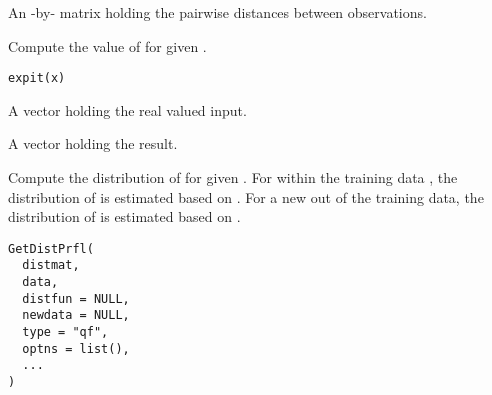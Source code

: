 \documentclass[a4paper]{book}
\begin{document}
%
\begin{Arguments}
\begin{ldescription}
\item[\code{distmat}] An -by- matrix holding the pairwise distances between observations.
\end{ldescription}
\end{Arguments}
%
\begin{Description}\relax
Compute the value of  for given .
\end{Description}
%
\begin{Usage}
\begin{verbatim}
expit(x)
\end{verbatim}
\end{Usage}
%
\begin{Arguments}
\begin{ldescription}
\item[\code{x}] A vector holding the real valued input.
\end{ldescription}
\end{Arguments}
%
\begin{Value}
A vector holding the result.
\end{Value}
%
\begin{Description}\relax
Compute the distribution of  for given . 
For  within the training data , 
the distribution of  is estimated based on .
For a new  out of the training data, 
the distribution of  is estimated based on .
\end{Description}
%
\begin{Usage}
\begin{verbatim}
GetDistPrfl(
  distmat,
  data,
  distfun = NULL,
  newdata = NULL,
  type = "qf",
  optns = list(),
  ...
)
\end{verbatim}
\end{Usage}
%
\end{document}

